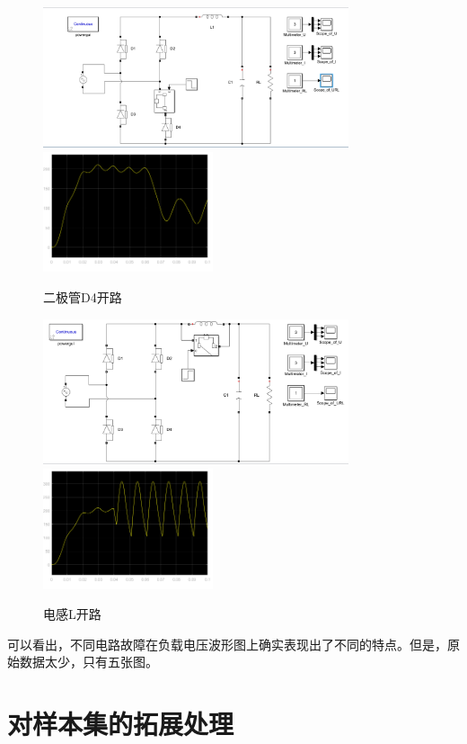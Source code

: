 \documentclass{article}
\begin{document}
	\begin{figure}[bhtp]
		\centering
		\includegraphics[width=9cm]{figure/D4_O.png}
		\quad
		\includegraphics[width=5cm]{figure/D4_S_URL.png}
		\caption{二极管D4开路}
	\end{figure}
	
	\begin{figure}[bhtp]
		\centering
		\includegraphics[width=9cm]{figure/L_O.png}
		\quad
		\includegraphics[width=5cm]{figure/L_O_URL.png}
		\caption{电感L开路}
	\end{figure}
	
	
	可以看出，不同电路故障在负载电压波形图上确实表现出了不同的特点。但是，原始数据太少，只有五张图。
	
	\section{对样本集的拓展处理}
	
\end{document}
